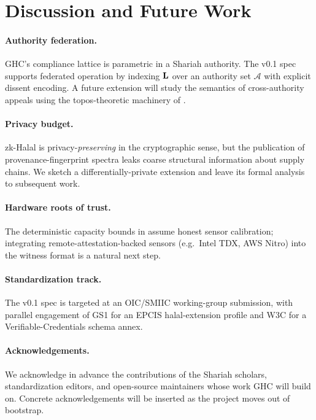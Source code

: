 \section{Discussion and Future Work}
\label{sec:discussion}

\paragraph{Authority federation.}
GHC's compliance lattice is parametric in a Shariah authority. The
v0.1 spec supports federated operation by indexing $\mathbf{L}$ over an
authority set $\mathcal{A}$ with explicit dissent encoding. A future
extension will study the semantics of cross-authority appeals using
the topos-theoretic machinery of \cite{maclane}.

\paragraph{Privacy budget.}
zk-Halal is privacy-\emph{preserving} in the cryptographic sense, but
the publication of provenance-fingerprint spectra leaks coarse
structural information about supply chains. We sketch a
differentially-private extension and leave its formal analysis to
subsequent work.

\paragraph{Hardware roots of trust.}
The deterministic capacity bounds in  assume honest
sensor calibration; integrating remote-attestation-backed sensors
(e.g.\ Intel TDX, AWS Nitro) into the witness format is a natural next
step.

\paragraph{Standardization track.}
The v0.1 spec is targeted at an OIC/SMIIC working-group submission,
with parallel engagement of GS1 for an EPCIS halal-extension profile
and W3C for a Verifiable-Credentials schema annex.

\paragraph{Acknowledgements.}
We acknowledge in advance the contributions of the Shariah scholars,
standardization editors, and open-source maintainers whose work GHC
will build on. Concrete acknowledgements will be inserted as the
project moves out of bootstrap.
